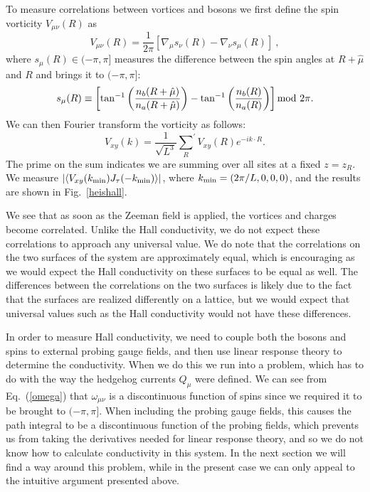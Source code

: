 To measure correlations between vortices and bosons we first define the spin vorticity $V_{\mu\nu}(R)$ as
\begin{equation}
V_{\mu\nu}(R) = \frac{1}{2\pi}[\nabla_\mu s_{\nu}(R) - \nabla_\nu s_{\mu}(R)] ~,
\label{Vmn}
\end{equation}
where $s_\mu(R) \in (-\pi, \pi]$ measures the difference between the spin angles at $R+\hat{\mu}$ and $R$ and brings it to $(-\pi,\pi]$:
\begin{equation}
s_{\mu}(R)\equiv \left[\tan^{-1}\left(\frac{n_b(R+\hat{\mu})}{n_a(R+\hat{\mu})}\right) -\tan^{-1}\left(\frac{n_b(R)}{n_a(R)}\right)\right]{\rm mod}~2\pi.\nonumber
\end{equation}
We can then Fourier transform the vorticity as follows:
\begin{equation}
V_{xy}(k) = \frac{1}{\sqrt{L^3}}{\sum_{R}}^\prime V_{xy}(R) e^{-ik\cdot R}.
\end{equation}
The prime on the sum indicates we are summing over all sites at a fixed $z=z_R$. We measure $\left|\langle V_{xy}(k_{\rm min})J_\tau(-k_{\rm min})\rangle\right|$, where $k_{\rm min}=(2\pi/L,0,0,0)$, and the results are shown in Fig.~\ref{heishall}. 

We see that as soon as the Zeeman field is applied, the vortices and charges become correlated. Unlike the Hall conductivity, we do not expect these correlations to approach any universal value. We do note that the correlations on the two surfaces of the system are approximately equal, which is encouraging as we would expect the Hall conductivity on these surfaces to be equal as well. The differences between the correlations on the two surfaces is likely due to the fact that the surfaces are realized differently on a lattice, but we would expect that universal values such as the Hall conductivity would not have these differences.

In order to measure Hall conductivity, we need to couple both the bosons and spins to external probing gauge fields, and then use linear response theory to determine the conductivity. When we do this we run into a problem, which has to do with the way the hedgehog currents $Q_\mu$ were defined. We can see from Eq.~(\ref{omega}) that $\omega_{\mu\nu}$ is a discontinuous function of spins since we required it to be brought to $(-\pi, \pi]$. When including the probing gauge fields, this causes the path integral to be a discontinuous function of the probing fields, which prevents us from taking the derivatives needed for linear response theory, and so we do not know how to calculate conductivity in this system. In the next section we will find a way around this problem, while in the present case we can only appeal to the intuitive argument presented above.


